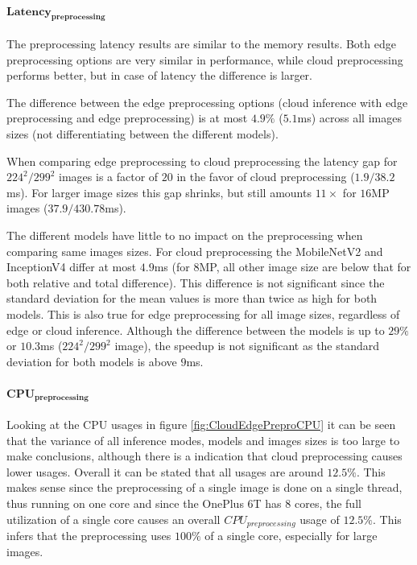 \paragraph{$\mathbf{Latency_{preprocessing}}$}
The preprocessing latency results are similar to the memory results. Both edge preprocessing options are very similar in performance, while cloud preprocessing performs better, but in case of latency the difference is larger.

The difference between the edge preprocessing options (cloud inference with edge preprocessing and edge preprocessing) is at most $4.9\%$ ($5.1$ms) across all images sizes (not differentiating between the different models).

When comparing edge preprocessing to cloud preprocessing the latency gap for $224^2/299^2$ images is a factor of $20$ in the favor of cloud preprocessing ($1.9/38.2$ms). For larger image sizes this gap shrinks, but still amounts $11\times$ for $16$MP images ($37.9/430.78$ms).

The different models have little to no impact on the preprocessing when comparing same images sizes.
For cloud preprocessing the MobileNetV2 and InceptionV4 differ at most $4.9$ms (for $8$MP, all other image size are below that for both relative and total difference). This difference is not significant since the standard deviation for the mean values is more than twice as high for both models.
This is also true for edge preprocessing for all image sizes, regardless of edge or cloud inference.
Although the difference between the models is up to $29\%$ or $10.3$ms ($224^2/299^2$ image), the speedup is not significant as the standard deviation for both models is above $9$ms.

\paragraph{$\mathbf{CPU_{preprocessing}}$}
Looking at the CPU usages in figure \ref{fig:CloudEdgePreproCPU} it can be seen that the variance of all inference modes, models and images sizes is too large to make conclusions, although there is a indication that cloud preprocessing causes lower usages.
Overall it can be stated that all usages are around $12.5\%$. This makes sense since the preprocessing of a single image is done on a single thread, thus running on one core and since the OnePlus 6T has 8 cores, the full utilization of a single core causes an overall $CPU_{preprocessing}$  usage of $12.5\%$. 
This infers that the preprocessing uses $100\%$ of a single core, especially for large images.

